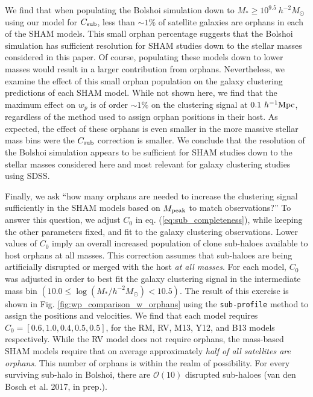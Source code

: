 \documentclass[useAMS,fleqn,usenatbib]{mnras}
\begin{document}
We find that when populating the Bolshoi simulation down to $M_* \geq 10^{9.5}~h^{-2}M_{\odot}$ using our model for $C_{\rm sub}$, less than $\sim 1\%$ of satellite galaxies are orphans in each of the SHAM models.  This small orphan percentage suggests that the Bolshoi simulation has sufficient resolution for SHAM studies down to the stellar masses considered in this paper.  Of course, populating these models down to lower masses would result in a larger contribution from orphans.  Nevertheless, we examine the effect of this small orphan population on the galaxy clustering predictions of each SHAM model.  While not shown here, we find that the maximum effect on $w_p$ is of order $\sim 1\%$ on the clustering signal at $0.1~h^{-1}{\rm Mpc}$, regardless of the method used to assign orphan positions in their host.  As expected, the effect of these orphans is even smaller in the more massive stellar mass bins were the $C_{\rm sub}$ correction is smaller.  We conclude that the resolution of the Bolshoi simulation appears to be sufficient for SHAM studies down to the stellar masses considered here and most relevant for galaxy clustering studies using SDSS.    

Finally, we ask ``how many orphans are needed to increase the clustering signal sufficiently in the SHAM models based on $M_{\rm peak}$ to match observations?''  To answer this question, we adjust $C_0$ in eq. (\ref{eq:sub_completeness}), while keeping the other parameters fixed, and fit to the galaxy clustering observations.  Lower values of $C_0$ imply an overall increased population of clone sub-haloes available to host orphans at all masses.  This correction assumes that sub-haloes are being artificially disrupted or merged with the host {\em at all masses}.  For each model, $C_0$ was adjusted in order to best fit the galaxy clustering signal in the intermediate mass bin $(10.0 \leq \log(M_*/h^{-2}M_{\odot}) <10.5)$.  The result of this exercise is shown in Fig. \ref{fig:wp_comparison_w_orphans} using the {\tt sub-profile} method to assign the positions and velocities.  We find that each model requires $C_{0} = [0.6,1.0, 0.4, 0.5, 0.5]$, for the RM, RV, M13, Y12, and B13 models respectively.  While the RV model does not require orphans, the mass-based SHAM models require that on average approximately {\em half of all satellites are orphans}. This number of orphans is within the realm of possibility.  For every surviving sub-halo in Bolshoi, there are $\mathcal{O}(10)$ disrupted sub-haloes (van den Bosch et al. 2017, in prep.).
\end{document}
